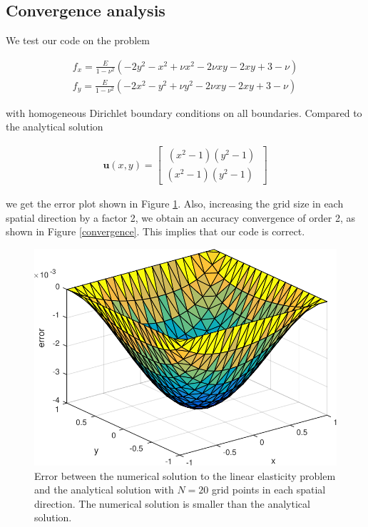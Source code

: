 
\subsection{Convergence analysis}

We test our code on the problem 

\begin{align}
f_x = \frac{E}{1-\nu^2} (-2y^2 - x^2 + \nu x^2 - 2\nu xy -2xy + 3 - \nu) \\
f_y = \frac{E}{1-\nu^2} (-2x^2 - y^2 + \nu y^2 - 2\nu xy -2xy + 3 - \nu) 
\end{align}

with homogeneous Dirichlet boundary conditions on all boundaries. Compared to the analytical solution 

\begin{align}
\bm{u}(x,y) = \begin{bmatrix}
\, (x^2-1)(y^2-1) \, \\
(x^2-1)(y^2-1)
\end{bmatrix}
\end{align}

we get the error plot shown in Figure \ref{error}. Also, increasing the grid size in each spatial direction by a factor 2, we obtain an accuracy convergence of order 2, as shown in Figure \ref{convergence}. This implies that our code is correct.

\begin{figure}
\center
\includegraphics[scale=0.5]{error_linEl}
\caption{Error between the numerical solution to the linear elasticity problem and the analytical solution with $N = 20$ grid points in each spatial direction. The numerical solution is smaller than the analytical solution.}
\label{error}
\end{figure}

